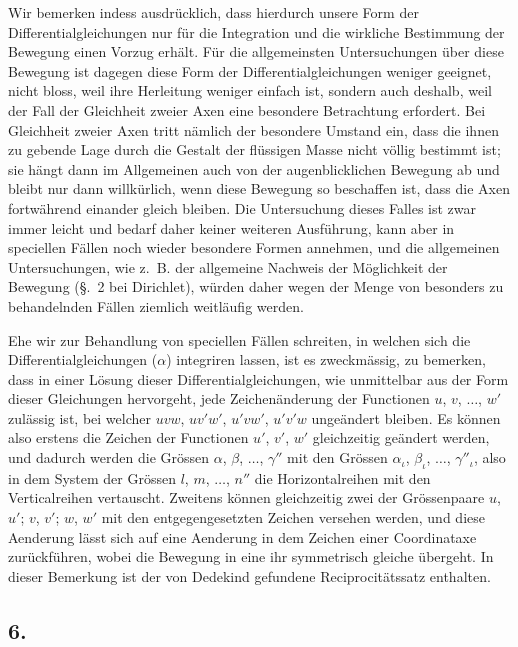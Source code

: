 \documentclass[12pt,a4paper]{book}
\theoremstyle{definition}
\theoremstyle{remark}
\begin{document}
Wir bemerken indess ausdrücklich, dass hierdurch unsere Form der Differentialgleichungen nur für die Integration und die wirkliche Bestimmung der Bewegung einen Vorzug erhält. Für die allgemeinsten Untersuchungen über diese Bewegung ist dagegen diese Form der Differentialgleichungen weniger geeignet, nicht bloss, weil ihre Herleitung weniger einfach ist, sondern auch deshalb, weil der Fall der Gleichheit zweier Axen eine besondere Betrachtung erfordert. Bei Gleichheit zweier Axen tritt nämlich der besondere Umstand ein, dass die ihnen zu gebende Lage durch die Gestalt der flüssigen Masse nicht völlig bestimmt ist; sie hängt dann im Allgemeinen auch von der augenblicklichen Bewegung ab und bleibt nur dann willkürlich, wenn diese Bewegung so beschaffen ist, dass die Axen fortwährend einander gleich bleiben. Die Untersuchung dieses Falles ist zwar immer leicht und bedarf daher keiner weiteren Ausführung, kann aber in speciellen Fällen noch wieder besondere Formen annehmen, und die allgemeinen Untersuchungen, wie z.~B. der allgemeine Nachweis der Möglichkeit der Bewegung (\S.~2 bei Dirichlet), würden daher wegen der Menge von besonders zu behandelnden Fällen ziemlich weitläufig werden.

Ehe wir zur Behandlung von speciellen Fällen schreiten, in welchen sich die Differentialgleichungen ($\alpha$) integriren lassen, ist es zweckmässig, zu bemerken, dass in einer Lösung dieser Differentialgleichungen, wie unmittelbar aus der Form dieser Gleichungen hervorgeht, jede Zeichenänderung der Functionen $u$, $v$, $\ldots$, $w'$ zulässig ist, bei welcher $uvw$, $uv'w'$, $u'vw'$, $u'v'w$ ungeändert bleiben. Es können also erstens die Zeichen der Functionen $u'$, $v'$, $w'$ gleichzeitig geändert werden, und dadurch werden die Grössen $\alpha$, $\beta$, $\ldots$, $\gamma''$ mit den Grössen $\alpha_\iota$, $\beta_\iota$, $\ldots$, $\gamma''_{\iota}$, also in dem System der Grössen $l$, $m$, $\ldots$, $n''$ die Horizontalreihen mit den Verticalreihen vertauscht. Zweitens können gleichzeitig zwei der Grössenpaare $u$, $u'$; $v$, $v'$; $w$, $w'$ mit den entgegengesetzten Zeichen versehen werden, und diese Aenderung lässt sich auf eine Aenderung in dem Zeichen einer Coordinataxe zurückführen, wobei die Bewegung in eine ihr symmetrisch gleiche übergeht. In dieser Bemerkung ist der von Dedekind gefundene Reciprocitätssatz enthalten.

\subsection*{6.}
\end{document}
